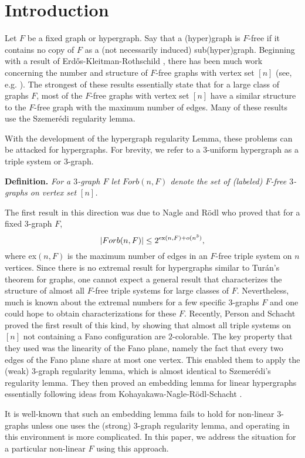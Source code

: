 \documentclass[11pt]{article}
\begin{document}
\section{Introduction}
 Let  $F$ be a fixed graph or hypergraph. Say that a (hyper)graph is $F$-free if it contains
  no copy of $F$ as a (not necessarily induced) sub(hyper)graph. Beginning with a result of
Erd\H os-Kleitman-Rothschild \cite{EKR}, there has been much work
concerning the number and structure of $F$-free graphs with vertex
set $[n]$ (see, e.g. \cite{EFR, KPR, PS1, BBS1, BBS2, BBS3, BSAM}). The
strongest of these results essentially state that for a large class of graphs $F$, most
of the $F$-free graphs with vertex set $[n]$ have a similar
structure to the $F$-free graph with the maximum number of edges.
Many of these results use  the Szemer\'edi regularity lemma.


With the development of the hypergraph regularity Lemma, these problems can be attacked for hypergraphs.
 For brevity, we refer to a $3$-uniform hypergraph as a triple system or $3$-graph.
 

 {\bf Definition.}
{\em For a $3$-graph $F$ let  $Forb(n, F)$ denote the set of  (labeled) $F$-free
$3$-graphs on vertex set $[n]$.  }

 The first result in this direction was due to Nagle and R\"odl \cite{NR} who proved that for a fixed 3-graph $F$,  
$$|Forb(n, F)| \le 2^{{\rm ex}(n, F) + o(n^3)},$$
where ex$(n,F)$ is the maximum number of edges in an $F$-free triple system on $n$ vertices.
 Since there is no extremal result for hypergraphs similar to Tur\'an's theorem for graphs,
  one cannot expect a general result that characterizes the structure of almost all $F$-free triple systems for large classes of $F$.
   Nevertheless, much is known about the extremal numbers for a few specific 3-graphs $F$ and one could hope
   to obtain characterizations for these $F$. Recently, Person and Schacht \cite{PSch} proved the first result of this kind, by showing that almost all
   triple systems on $[n]$ not containing a Fano configuration are $2$-colorable.
   The key property that they used was the linearity of the Fano plane,
   namely the fact that every two edges of the Fano plane share at most one vertex.
   This enabled them to apply the (weak) $3$-graph regularity lemma, which is almost
   identical to Szemer\'edi's regularity lemma.  They then proved an embedding lemma for linear
    hypergraphs essentially following ideas from Kohayakawa-Nagle-R\"odl-Schacht \cite{KNRS}.

It is well-known that such an embedding lemma fails to hold for
non-linear $3$-graphs unless one uses the (strong) $3$-graph
regularity lemma, and operating in this environment is more
complicated. In this paper, we address the situation for a
particular non-linear $F$ using this approach.
\end{document}
